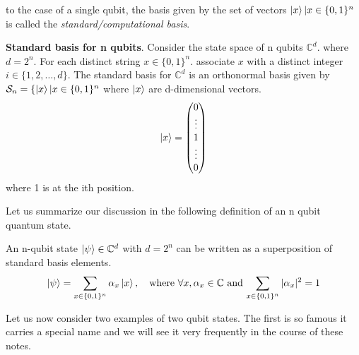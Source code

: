 to the case of a single qubit, the basis given by the set of vectors ${\ket{x} | x \in \{0,1\}^n}$ is called the
\textit{standard/computational basis}.

\begin{definition}
    \textbf{Standard basis for n qubits}. Consider the state space of n qubits $\mathbb{C}^d$. where $d=2^n$. For each distinct string $x \in \{0,1\}^n$. associate $x$ with a distinct integer $i \in \{1,2,\ldots ,d\}$. The standard basis for $\mathbb{C}^d$ is an orthonormal basis given by $\mathcal{S}_n=\{\ket{x} | x \in \{0,1\}^n$
    where $\ket{x}$ are d-dimensional vectors.
    \[
    \ket{x}=\begin{pmatrix} 0 \\ \vdots \\  1 \\ \vdots \\ 0 \end{pmatrix}
    \]
    where 1 is at the ith position.
\end{definition}
Let us summarize our discussion in the following definition of an n qubit quantum state.
\begin{definition}
    An n-qubit state $\ket{\psi} \in \mathbb{C}^d$ with $d=2^n$ can be written as a superposition of standard basis elements.
    \[
    \ket{\psi} = \sum_{x\in\{0,1\}^n}\alpha_x\ket{x}, \quad \text{where $\forall x, \alpha_x \in \mathbb{C}$ and $\sum_{x \in \{0,1\}^n} |\alpha_x|^2=1$}
    \]
\end{definition}
Let us now consider two examples of two qubit states. The first is so famous it carries a special
name and we will see it very frequently in the course of these notes.
